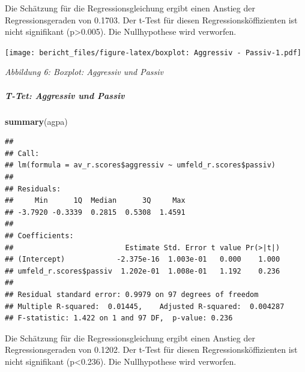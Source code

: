 \documentclass[]{article}
\newenvironment{Shaded}{\begin{snugshade}}{\end{snugshade}}
\newcommand{\KeywordTok}[1]{\textcolor[rgb]{0.13,0.29,0.53}{\textbf{{#1}}}}
\newcommand{\DataTypeTok}[1]{\textcolor[rgb]{0.13,0.29,0.53}{{#1}}}
\newcommand{\StringTok}[1]{\textcolor[rgb]{0.31,0.60,0.02}{{#1}}}
\newcommand{\NormalTok}[1]{{#1}}
\let\oldsubparagraph\subparagraph
\renewcommand{\subparagraph}[1]{\oldsubparagraph{#1}\mbox{}}
\begin{document}
Die Schätzung für die Regressionsgleichung ergibt einen Anstieg der
Regressionsgeraden von 0.1703. Der t-Test für diesen
Regressionsköffizienten ist nicht signifikant (p\textgreater{}0.005).
Die Nullhypothese wird verworfen.

\begin{Shaded}
\end{Shaded}

\texttt{[image: bericht\_files/figure-latex/boxplot: Aggressiv - Passiv-1.pdf]}

\begin{center}
\textit{Abbildung 6: Boxplot: Aggressiv und Passiv}
\bigskip
\end{center}

\subparagraph{T-Tet: Aggressiv und
Passiv}\label{t-tet-aggressiv-und-passiv}

\begin{Shaded}
\begin{Highlighting}[]
\KeywordTok{summary}\NormalTok{(agpa)}
\end{Highlighting}
\end{Shaded}

\begin{verbatim}
## 
## Call:
## lm(formula = av_r.scores$aggressiv ~ umfeld_r.scores$passiv)
## 
## Residuals:
##     Min      1Q  Median      3Q     Max 
## -3.7920 -0.3339  0.2815  0.5308  1.4591 
## 
## Coefficients:
##                          Estimate Std. Error t value Pr(>|t|)
## (Intercept)            -2.375e-16  1.003e-01   0.000    1.000
## umfeld_r.scores$passiv  1.202e-01  1.008e-01   1.192    0.236
## 
## Residual standard error: 0.9979 on 97 degrees of freedom
## Multiple R-squared:  0.01445,    Adjusted R-squared:  0.004287 
## F-statistic: 1.422 on 1 and 97 DF,  p-value: 0.236
\end{verbatim}

Die Schätzung für die Regressionsgleichung ergibt einen Anstieg der
Regressionsgeraden von 0.1202. Der t-Test für diesen
Regressionsköffizienten ist nicht signifikant (p\textless{}0.236). Die
Nullhypothese wird verworfen.
\end{document}
